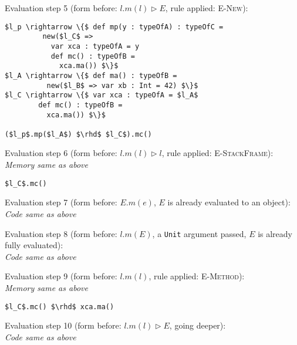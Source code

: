 \documentclass{llncs}
\begin{document}
\vspace{12pt}
\noindent Evaluation step 5 (form before: $l.m(l) \rhd E$, rule applied: \textsc{E-New}):
\vspace{-6pt}
\begin{lstlisting}[xleftmargin=20pt]
$l_p \rightarrow \{$ def mp(y : typeOfA) : typeOfC =
         new($l_C$ =>
           var xca : typeOfA = y
           def mc() : typeOfB =
             xca.ma()) $\}$
$l_A \rightarrow \{$ def ma() : typeOfB =
          new($l_B$ => var xb : Int = 42) $\}$
$l_C \rightarrow \{$ var xca : typeOfA = $l_A$
        def mc() : typeOfB =
          xca.ma()) $\}$

($l_p$.mp($l_A$) $\rhd$ $l_C$).mc()
\end{lstlisting}

\vspace{12pt}
\noindent Evaluation step 6 (form before: $l.m(l) \rhd l$, rule applied: \textsc{E-StackFrame}):\\
\vspace{-6pt}
\indent\textit{Memory same as above}\\
\vspace{-6pt}
\begin{lstlisting}[xleftmargin=20pt]
$l_C$.mc()
\end{lstlisting}

\vspace{12pt}
\noindent Evaluation step 7 (form before: $E.m(e)$, $E$ is already evaluated to an object):\\
\indent\textit{Code same as above}

\vspace{12pt}
\noindent Evaluation step 8 (form before: $l.m(E)$, a \lstinline{Unit} argument passed, $E$ is already fully evaluated):\\
\indent\textit{Code same as above}

\vspace{12pt}
\noindent Evaluation step 9 (form before: $l.m(l)$, rule applied: \textsc{E-Method}):\\
\vspace{-6pt}
\indent\textit{Memory same as above}\\
\vspace{-6pt}
\begin{lstlisting}[xleftmargin=20pt]
$l_C$.mc() $\rhd$ xca.ma()
\end{lstlisting}

\vspace{12pt}
\noindent Evaluation step 10 (form before: $l.m(l) \rhd E$, going deeper):\\
\textit{Code same as above}
\end{document}
